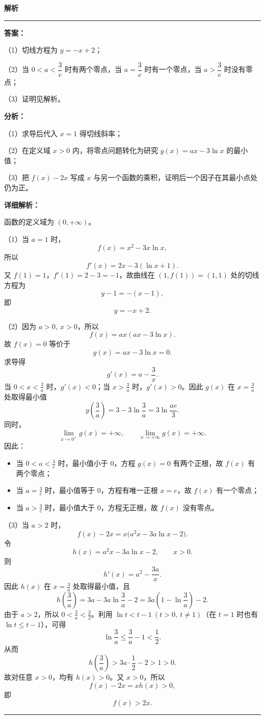 \documentclass[UTF8,12pt,a4paper]{ctexart}
\newenvironment{examSolutionBox}{%
  \par\medskip\begingroup
  \setlength{\leftskip}{1.0em}\setlength{\rightskip}{0.9em}%
  \noindent\textcolor{SolutionTeal}{\bfseries\large 解析}\par
  \smallskip\noindent\textcolor{SolutionRule}{\rule{\dimexpr\linewidth-\leftskip-\rightskip\relax}{0.8pt}}\par
  \smallskip\color{SolutionInk}%
}{%
  \par\smallskip\noindent\textcolor{SolutionRule}{\rule{\dimexpr\linewidth-\leftskip-\rightskip\relax}{0.8pt}}\par
  \endgroup\medskip
}
\providecommand{\tightlist}{%
  \setlength{\itemsep}{0pt}\setlength{\parskip}{0pt}}
\begin{document}
\begin{examSolutionBox}

\textbf{答案：}
\par\smallskip\noindent（1）切线方程为 \(y=-x+2\)；
\par\smallskip\noindent（2）当 \(0<a<\dfrac3e\) 时有两个零点，当 \(a=\dfrac3e\) 时有一个零点，当 \(a>\dfrac3e\) 时没有零点；
\par\smallskip\noindent（3）证明见解析。

\textbf{分析：}
\par\smallskip\noindent（1）求导后代入 \(x=1\) 得切线斜率；
\par\smallskip\noindent（2）在定义域 \(x>0\) 内，将零点问题转化为研究 \(g(x)=ax-3\ln x\) 的最小值；
\par\smallskip\noindent（3）把 \(f(x)-2x\) 写成 \(x\) 与另一个函数的乘积，证明后一个因子在其最小点处仍为正。

\textbf{详细解析：}

函数的定义域为 \((0,+\infty)\)。


\par\smallskip\noindent（1）当 \(a=1\) 时，
\[
   f(x)=x^2-3x\ln x,
   \]
所以
\[
   f'(x)=2x-3(\ln x+1).
   \]
又 \(f(1)=1\)，\(f'(1)=2-3=-1\)，故曲线在 \((1,f(1))=(1,1)\) 处的切线方程为
\[
   y-1=-(x-1),
   \]
即
\[
   \boxed{y=-x+2}.
   \]


\par\smallskip\noindent（2）因为 \(a>0,\ x>0\)，所以
\[
   f(x)=ax(ax-3\ln x).
   \]
故 \(f(x)=0\) 等价于
\[
   g(x)=ax-3\ln x=0.
   \]
求导得
\[
   g'(x)=a-\frac3x.
   \]
当 \(0<x<\frac3a\) 时，\(g'(x)<0\)；当 \(x>\frac3a\) 时，\(g'(x)>0\)。因此 \(g(x)\) 在 \(x=\frac3a\) 处取得最小值
\[
   g\left(\frac3a\right)
   =3-3\ln\frac3a
   =3\ln\frac{ae}{3}.
   \]
同时，
\[
   \lim_{x\to0^+}g(x)=+\infty,\qquad
   \lim_{x\to+\infty}g(x)=+\infty.
   \]
因此：

\begin{itemize}
\tightlist
\item
  当 \(0<a<\frac3e\) 时，最小值小于 \(0\)，方程 \(g(x)=0\) 有两个正根，故 \(f(x)\) 有两个零点；
\item
  当 \(a=\frac3e\) 时，最小值等于 \(0\)，方程有唯一正根 \(x=e\)，故 \(f(x)\) 有一个零点；
\item
  当 \(a>\frac3e\) 时，最小值大于 \(0\)，方程无正根，故 \(f(x)\) 没有零点。
\end{itemize}


\par\smallskip\noindent（3）当 \(a>2\) 时，
\[
   f(x)-2x
   =x\bigl(a^2x-3a\ln x-2\bigr).
   \]
令
\[
   h(x)=a^2x-3a\ln x-2,\qquad x>0.
   \]
则
\[
   h'(x)=a^2-\frac{3a}{x}.
   \]
因此 \(h(x)\) 在 \(x=\frac3a\) 处取得最小值，且
\[
   h\left(\frac3a\right)
   =3a-3a\ln\frac3a-2
   =3a\left(1-\ln\frac3a\right)-2.
   \]
由于 \(a>2\)，所以 \(0<\frac3a<\frac32\)。利用 \(\ln t<t-1\ (t>0,\ t\ne1)\)（在 \(t=1\) 时也有 \(\ln t\le t-1\)），可得
\[
   \ln\frac3a\leqslant\frac3a-1<\frac12.
   \]
从而
\[
   h\left(\frac3a\right)
   >3a\cdot\frac12-2
   >1>0.
   \]
故对任意 \(x>0\)，均有 \(h(x)>0\)。又 \(x>0\)，所以
\[
   f(x)-2x=xh(x)>0,
   \]
即
\[
   \boxed{f(x)>2x}.
   \]

\end{examSolutionBox}
\end{document}

